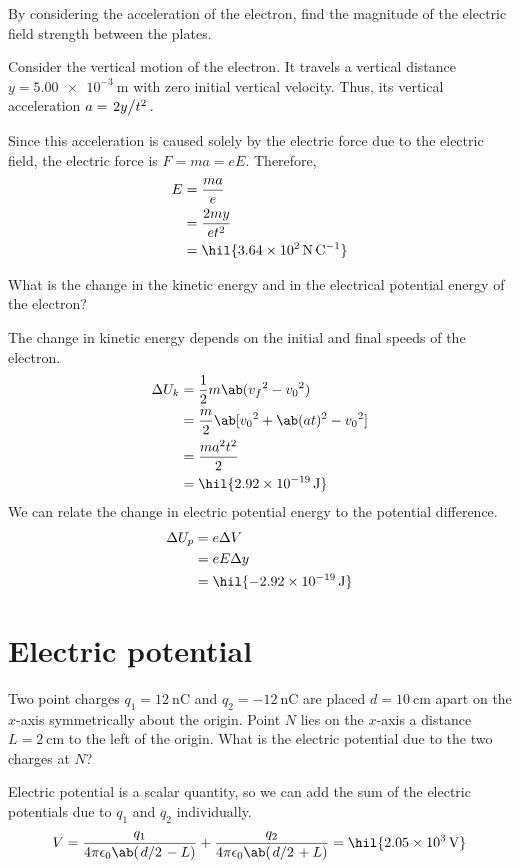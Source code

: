 \begin{problem}
By considering the acceleration of the electron, find the magnitude of the electric field strength
between the plates.
\end{problem}
Consider the vertical motion of the electron. It travels
a vertical distance \(y = \qty{5.00e-3}{\metre}\) with zero initial vertical velocity.
Thus, its vertical acceleration \(a = \lf{2y}{t^2}\).

Since this acceleration is caused solely by the electric force due to the electric field,
the electric force is \(F = ma = eE\). Therefore,
\begin{align*}
	E & = \f{ma}{e}                               \\
	  & = \f{2my}{et^2}                           \\
	  & = \hil{\qty{3.64e2}{\newton\per\coulomb}}
\end{align*}

\begin{problem}
What is the change in the kinetic energy and in the electrical potential energy of the electron?
\end{problem}
The change in kinetic energy depends on the initial and final speeds of the electron.
\begin{align*}
	\Delta U_k & = \f{1}{2}m\ab({v_f}^2 - {v_0}^2)            \\
	           & = \f{m}{2}\ab[{v_0}^2 + \ab(at)^2 - {v_0}^2] \\
	           & = \f{ma^2t^2}{2}                             \\
	           & = \hil{\qty{2.92e-19}{\joule}}
\end{align*}
We can relate the change in electric potential energy to the potential difference.
\begin{align*}
	\Delta U_p & = e\Delta V                     \\
	           & = eE\Delta y                    \\
	           & = \hil{\qty{-2.92e-19}{\joule}}
\end{align*}

\section{Electric potential}
\begin{problem}
Two point charges \(q_1 = \qty{12}{\nano\coulomb}\) and \(q_2 = \qty{-12}{\nano\coulomb}\)
are placed \(d = \qty{10}{\centi\metre}\) apart on the \(x\)-axis symmetrically about the origin.
Point \(N\) lies on the \(x\)-axis a distance \(L = \qty{2}{\centi\metre}\) to the left of the origin.
What is the electric potential due to the two charges at \(N\)?
\end{problem}
Electric potential is a scalar quantity, so we can add the sum of the electric potentials due to \(q_1\) and \(q_2\)
individually.
\begin{equation*}
	V = \f{q_1}{4\pi\epsilon_0\ab(\lf{d}{2} - L)} + \f{q_2}{4\pi\epsilon_0 \ab(\lf{d}{2}+L)} = \hil{\qty{2.05e3}{\volt}}
\end{equation*}

